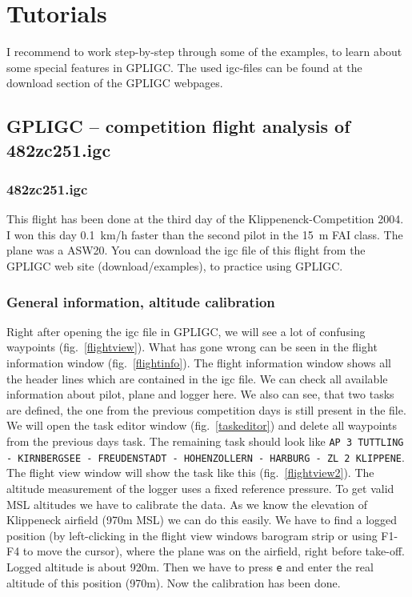 
\section{Tutorials}

I recommend to work step-by-step through some of the examples, to learn about some special features in GPLIGC.
The used igc-files can be found at the download section of the GPLIGC webpages.

\subsection{GPLIGC -- competition flight analysis  of 482zc251.igc}

\subsubsection{482zc251.igc}
This flight has been done at the third day of the Klippenenck-Competition 2004.
I won this day 0.1~km/h faster than the second pilot in the 15~m FAI class. The plane was a ASW20.
You can download the igc file of this flight from the GPLIGC web site (download/examples), to practice using GPLIGC.

\subsubsection{General information, altitude calibration}
Right after opening the igc file in GPLIGC, we will see a lot of confusing waypoints (fig.~\ref{flightview}).
What has gone wrong can be seen in the flight information window (fig.~\ref{flightinfo}).
The flight information window shows all the header lines which are contained in the igc file.
We can check all available information about pilot, plane and logger here.
We also can see, that two tasks are defined, the one from the previous competition days is still present in the file.
We will open the task editor window (fig.~\ref{taskeditor}) and delete all waypoints from the previous days task.
The remaining task should look like \texttt{AP 3 TUTTLING - KIRNBERGSEE - FREUDENSTADT - HOHENZOLLERN - HARBURG - ZL 2 KLIPPENE}.
The flight view window will show the task like this (fig.~\ref{flightview2}).
The altitude measurement of the logger uses a fixed reference pressure.
To get valid MSL altitudes we have to calibrate the data.
As we know the elevation of Klippeneck airfield (970m MSL) we can do this easily.
We have to find a logged position (by left-clicking in the flight view windows barogram strip or using F1-F4 to move the cursor),
where the plane was on the airfield, right before take-off. Logged altitude is about 920m.
Then we have to press \texttt{e} and enter the real altitude of this position (970m).
Now the calibration has been done.

